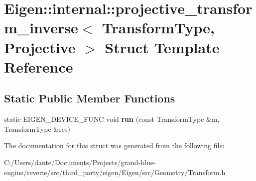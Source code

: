 \hypertarget{struct_eigen_1_1internal_1_1projective__transform__inverse_3_01_transform_type_00_01_projective_01_4}{}\section{Eigen\+::internal\+::projective\+\_\+transform\+\_\+inverse$<$ Transform\+Type, Projective $>$ Struct Template Reference}
\label{struct_eigen_1_1internal_1_1projective__transform__inverse_3_01_transform_type_00_01_projective_01_4}
\subsection*{Static Public Member Functions}
\begin{DoxyCompactItemize}
\item 
\mbox{\label{struct_eigen_1_1internal_1_1projective__transform__inverse_3_01_transform_type_00_01_projective_01_4_ad57fa380b8eecc66ee5005d22f3fe306}} 
static E\+I\+G\+E\+N\+\_\+\+D\+E\+V\+I\+C\+E\+\_\+\+F\+U\+NC void {\bfseries run} (const Transform\+Type \&m, Transform\+Type \&res)
\end{DoxyCompactItemize}


The documentation for this struct was generated from the following file\+:\begin{DoxyCompactItemize}
\item 
C\+:/\+Users/dante/\+Documents/\+Projects/grand-\/blue-\/engine/reverie/src/third\+\_\+party/eigen/\+Eigen/src/\+Geometry/Transform.\+h\end{DoxyCompactItemize}
